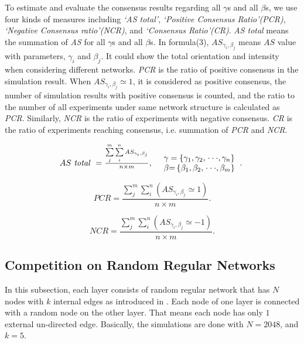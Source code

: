 \documentclass[english]{cccconf}
\begin{document}
To estimate and evaluate the consensus results regarding all $\gamma$s and all $\beta$s, we use four kinds of measures including \textit{`AS total'}, \textit{`Positive Consensus Ratio'(PCR)}, \textit{`Negative Consensus ratio'(NCR)}, and \textit{`Consensus Ratio'(CR)}. \textit{AS total} means the summation of \textit{AS} for all $\gamma$s and all $\beta$s. In formula(3), ${A{S_{{\gamma _i},{\beta _j}}}}$ means $AS$ value with parameters, $\gamma_i$ and $\beta_j$. It could show the total orientation and intensity when considering different networks. \textit{PCR} is the ratio of positive consensus in the simulation result. When ${A{S_{{\gamma _i},{\beta _j}}} \simeq  1}$, it is considered as positive consensus, the number of simulation results with positive consensus is counted, and the ratio to the number of all experiments under same network structure is calculated as \textit{PCR}. Similarly, \textit{NCR} is the ratio of experiments with negative consensus. \textit{CR} is the ratio of experiments reaching consensus, i.e. summation of \textit{PCR} and \textit{NCR}.

\begin{equation}
\begin{array}{cl}
AS\mbox{ \textit{total} } = \frac{{\sum\limits_j^m {\sum\limits_i^n {A{S_{{\gamma _i},{\beta _j}}}} } }}{{n \times m }}, &
\begin{array}{l}
\gamma  = \left\{ {{\gamma _{\rm{1}}},{\gamma _{\rm{2}}},\left. {\cdot\cdot\cdot,{\gamma _n}} \right\}} \right.\\
\beta {\rm{ = }}\left\{ {{\beta _{\rm{1}}},{\beta _{\rm{2}}},\left. {\cdot\cdot\cdot,{\beta _m}} \right\}} \right.
\end{array}.\
\end{array}
\end{equation}

\begin{equation}
PCR = \frac{{\sum\limits_j^m {\sum\limits_i^n {(A{S_{{\gamma _i},{\beta _j}}} \simeq  1)} } }}{{n \times m}}.
\end{equation}

\begin{equation}
NCR = \frac{{\sum\limits_j^m {\sum\limits_i^n {(A{S_{{\gamma _i},{\beta _j}}} \simeq   - 1)} } }}{{n \times m}}.
\end{equation}

\subsection{Competition on Random Regular Networks}
In this subsection, each layer consists of random regular network that has $N$ nodes with $k$ internal edges as introduced in \cite{kimsangwoo2012, bela2001}. Each node of one layer is connected with a random node on the other layer. That means each node has only $1$ external un-directed edge. Basically, the simulations are done with $N=2048$, and $k=5$. 
\end{document}
